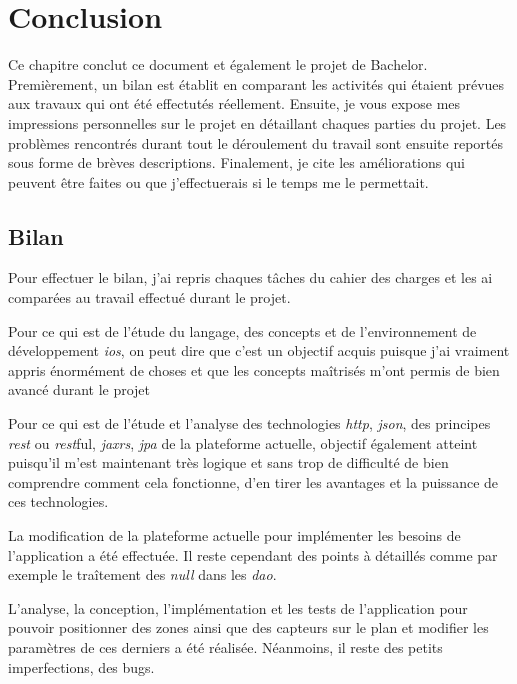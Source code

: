
\chapter{Conclusion} %
\label{cha:conclusion}

Ce chapitre conclut ce document et également le projet de Bachelor. Premièrement, un bilan est établit en comparant les activités qui étaient prévues aux travaux qui ont été effectutés réellement. Ensuite, je vous expose mes impressions personnelles sur le projet en détaillant chaques parties du projet. Les problèmes rencontrés durant tout le déroulement du travail sont ensuite reportés sous forme de brèves descriptions. Finalement, je cite les améliorations qui peuvent être faites ou que j'effectuerais si le temps me le permettait.

\section{Bilan} %
\label{sec:bilan}

Pour effectuer le bilan, j'ai repris chaques tâches du cahier des charges et les ai comparées au travail effectué durant le projet.

\medskip

Pour ce qui est de l'étude du langage, des concepts et de l'environnement de développement \emph{\gls{ios}}, on peut dire que c'est un objectif acquis puisque j'ai vraiment appris énormément de choses et que les concepts maîtrisés m'ont permis de bien avancé durant le projet

\medskip

Pour ce qui est de l'étude et l'analyse des technologies \emph{\gls{http}}, \emph{\gls{json}}, des principes \emph{\gls{rest}} ou \emph{\gls{rest}}ful, \emph{\gls{jaxrs}}, \emph{\gls{jpa}} de la plateforme actuelle, objectif également atteint puisqu'il m'est maintenant très logique et sans trop de difficulté de bien comprendre comment cela fonctionne, d'en tirer les avantages et la puissance de ces technologies.

\medskip

La modification de la plateforme actuelle pour implémenter les besoins de l'application a été effectuée. Il reste cependant des points à détaillés comme par exemple le traîtement des \emph{null} dans les \emph{\gls{dao}}.

\medskip

L'analyse, la conception, l'implémentation et les tests de l'application pour pouvoir positionner des zones ainsi que des capteurs sur le plan et modifier les paramètres de ces derniers a été réalisée. Néanmoins, il reste des petits imperfections, des bugs.

